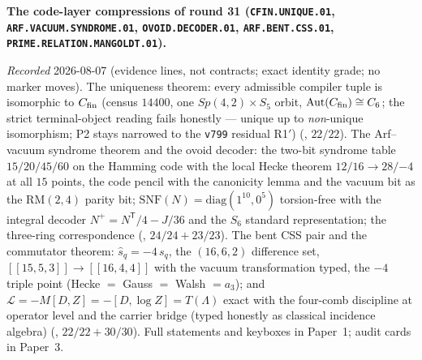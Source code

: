 \documentclass[11pt,a4paper]{article}
\begin{document}
\par\smallskip\noindent\textbf{The code-layer compressions of
round 31 (\texttt{CFIN.UNIQUE.01},
\texttt{ARF.VACUUM.SYNDROME.01}, \texttt{OVOID.DECODER.01},
\texttt{ARF.BENT.CSS.01}, \texttt{PRIME.RELATION.MANGOLDT.01}).}
{\sloppy
\emph{Recorded} 2026-08-07 (evidence lines, not contracts; exact
identity grade; no marker moves).  The uniqueness theorem: every
admissible compiler tuple is isomorphic to $C_{\rm fin}$ (census
$14400$, one $Sp(4,2)\times S_5$ orbit,
$\mathrm{Aut}(C_{\rm fin}) \cong C_6$; the strict
terminal-object reading fails honestly --- unique up to
\emph{non}-unique isomorphism; P2 stays narrowed to the
\texttt{v799} residual R1$'$)
(, $22/22$).  The
Arf--vacuum syndrome theorem and the ovoid decoder: the two-bit
syndrome table $15/20/45/60$ on the Hamming code with the local
Hecke theorem $12/16 \to 28/{-4}$ at all $15$ points, the code
pencil with the canonicity lemma and the vacuum bit as the
$\mathrm{RM}(2,4)$ parity bit; $\mathrm{SNF}(N) =
\mathrm{diag}(1^{10}, 0^5)$ torsion-free with the integral
decoder $N^{+} = N^{\mathsf T}/4 - J/36$ and the $S_6$ standard
representation; the three-ring correspondence
(, $24/24 + 23/23$).  The bent
CSS pair and the commutator theorem: $\hat s_q = -4\,s_q$, the
$(16,6,2)$ difference set, $[[15,5,3]] \to [[16,4,4]]$ with the
vacuum transformation typed, the $-4$ triple point (Hecke $=$
Gauss $=$ Walsh $= a_3$); and $\mathcal L = -M[D,Z] = -[D, \log
Z] = T(\Lambda)$ exact with the four-comb discipline at operator
level and the carrier bridge (typed honestly as classical
incidence algebra)
(, $22/22 + 30/30$).  Full
statements and keyboxes in Paper~1; audit cards in Paper~3.\par}
\end{document}
